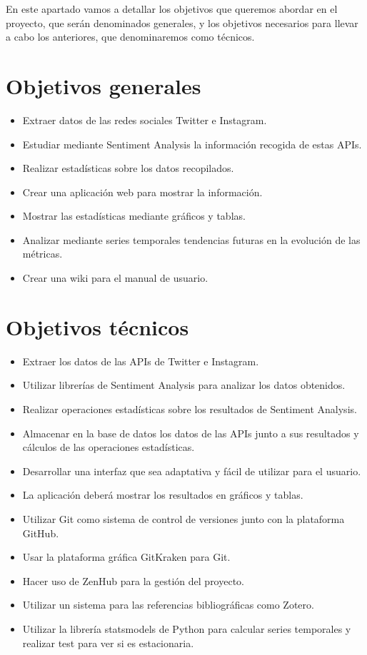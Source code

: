 
En este apartado vamos a detallar los objetivos que queremos abordar en el proyecto, que serán denominados generales, y los objetivos necesarios para llevar a cabo los anteriores, que denominaremos como técnicos.

\section{Objetivos generales}
\begin{itemize}
\tightlist
    \item Extraer datos de las redes sociales Twitter e Instagram.
    \item Estudiar mediante Sentiment Analysis la información recogida de estas APIs.
    \item Realizar estadísticas sobre los datos recopilados.
    \item Crear una aplicación web para mostrar la información.
    \item Mostrar las estadísticas mediante gráficos y tablas.
    \item Analizar mediante series temporales tendencias futuras en la evolución de las métricas.
    \item Crear una wiki para el manual de usuario.
\end{itemize}

\clearpage

\section{Objetivos técnicos}
\begin{itemize}
\tightlist
    \item Extraer los datos de las APIs de Twitter e Instagram.
    \item Utilizar librerías de Sentiment Analysis para analizar los datos obtenidos.
    \item Realizar operaciones estadísticas sobre los resultados de Sentiment Analysis.
    \item Almacenar en la base de datos los datos de las APIs junto a sus resultados y cálculos de las operaciones estadísticas.
    \item Desarrollar una interfaz que sea adaptativa y fácil de utilizar para el usuario.
    \item La aplicación deberá mostrar los resultados en gráficos y tablas.
    \item Utilizar Git como sistema de control de versiones junto con la plataforma GitHub.
    \item Usar la plataforma gráfica GitKraken para Git.
    \item Hacer uso de ZenHub para la gestión del proyecto.
    \item Utilizar un sistema para las referencias bibliográficas como Zotero.
    \item Utilizar la librería statsmodels de Python para calcular series temporales y realizar test para ver si es estacionaria.
\end{itemize}